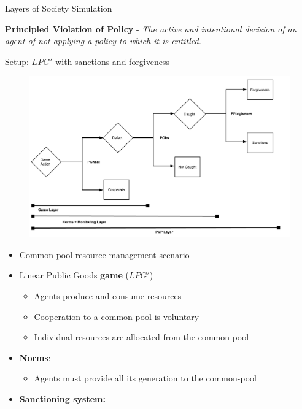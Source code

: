 \documentclass[xcolor={table}]{beamer}
\begin{document}
\begin{frame}[fragile=singleslide,t]
\begin{columns}[T]
\begin{column}{.47\textwidth}
\begin{block}{Layers of Society Simulation}

\textbf{Principled Violation of Policy} -
\emph{The active and
intentional decision of an agent of not applying a policy to which it is entitled.}


\end{block}


\begin{block}{Setup: $LPG'$ with sanctions and forgiveness}
\begin{figure}
  \centering
  \includegraphics[width=1.0\linewidth]{img/punishflow.pdf} 
  \label{fig:flow}
\end{figure}
\begin{itemize}
\item Common-pool resource management scenario
\item Linear Public Goods \textbf{game} ($LPG'$)
\begin{itemize}
    \item Agents produce and consume resources
    \item Cooperation to a common-pool is voluntary
    \item Individual resources are allocated from the common-pool
\end{itemize}
\item \textbf{Norms}:
\begin{itemize}
    \item Agents must provide all its generation to the common-pool
\end{itemize}
\item \textbf{Sanctioning system:}
\begin{itemize}

\end{itemize}
\end{itemize}
\end{block}
\end{column}
\end{columns}
\end{frame}
\end{document}
